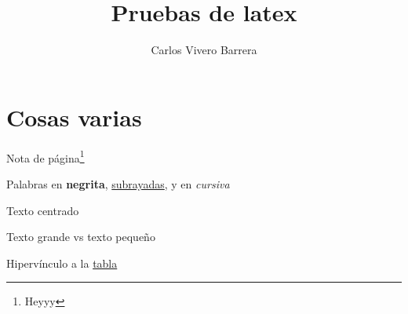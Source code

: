 \documentclass{article}
\title{Pruebas de latex}
\author{Carlos Vivero Barrera}
\begin{document}
\maketitle

\tableofcontents
\newpage

\section{Cosas varias}
    Nota de página\footnote{Heyyy}

    Palabras en \textbf{negrita}, \underline{subrayadas}, y en \textit{cursiva}
    \begin{center}
        Texto centrado
    \end{center}

    \large{Texto grande} vs \footnotesize{texto pequeño}
    
    Hipervínculo a la \hyperref[tab:tabla1]{tabla}
    \newpage
\end{document}
